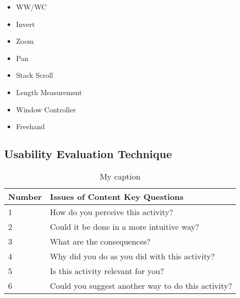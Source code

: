 \begin{itemize}
  \item WW/WC
  \item Invert
  \item Zoom
  \item Pan
  \item Stack Scroll
  \item Length Measurement
  \item Window Controller
  \item Freehand
\end{itemize}

\subsection{Usability Evaluation Technique}

\begin{table}[h]
\centering
\label{table:key_questions}
\begin{tabular}{l|l}
Number & Issues of Content Key Questions                    \\ \hline
1      & How do you perceive this activity?                 \\
2      & Could it be done in a more intuitive way?          \\
3      & What are the consequences?                         \\
4      & Why did you do as you did with this activity?      \\
5      & Is this activity relevant for you?                 \\
6      & Could you suggest another way to do this activity?
\end{tabular}
\caption{My caption}
\end{table}

\clearpage